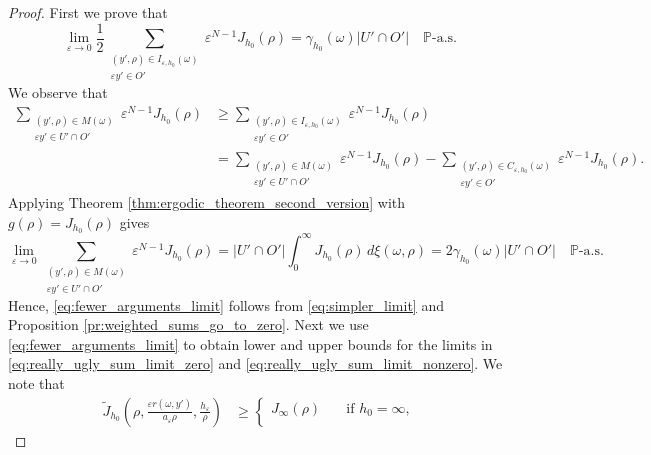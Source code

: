 \documentclass{article}
\numberwithin{equation}{section}
\theoremstyle{definition}
\theoremstyle{remark}
\begin{document}
\begin{proof}
    First we prove that
    \begin{equation} \label{eq:fewer_arguments_limit}
        \lim_{\varepsilon \to 0} \frac{1}{2} \sum \limits_{\substack{(y', \rho) \in I_{\varepsilon, h_0}(\omega) \\ \varepsilon y' \in O'}} \varepsilon^{N - 1} J_{h_0}(\rho) = \gamma_{h_0}(\omega) |U' \cap O'| \quad \mathbb{P}\text{-a.s.}
    \end{equation}
    We observe that
    \begin{align*}
        \sum \limits_{\substack{(y', \rho) \in M(\omega) \\ \varepsilon y' \in U' \cap O'}} \varepsilon^{N - 1} J_{h_0}(\rho) &\ge \sum \limits_{\substack{(y', \rho) \in I_{\varepsilon, h_0}(\omega) \\ \varepsilon y' \in O'}} \varepsilon^{N - 1} J_{h_0}(\rho) \\
        &= \sum \limits_{\substack{(y', \rho) \in M(\omega) \\ \varepsilon y' \in U' \cap O'}} \varepsilon^{N - 1} J_{h_0}(\rho) - \sum \limits_{\substack{(y', \rho) \in C_{\varepsilon, h_0}(\omega) \\ \varepsilon y' \in O'}} \varepsilon^{N - 1} J_{h_0}(\rho).
    \end{align*}
    Applying Theorem \ref{thm:ergodic_theorem_second_version} with $g(\rho) = J_{h_0}(\rho)$ gives
    \begin{equation} \label{eq:simpler_limit}
        \lim_{\varepsilon \to 0} \sum \limits_{\substack{(y', \rho) \in M(\omega) \\ \varepsilon y' \in U' \cap O'}} \varepsilon^{N - 1} J_{h_0}(\rho) = |U' \cap O'| \int_0^\infty J_{h_0}(\rho) \, d\xi(\omega, \rho) = 2 \gamma_{h_0}(\omega) |U' \cap O'| \quad \mathbb{P}\text{-a.s.}
    \end{equation}
    Hence, \eqref{eq:fewer_arguments_limit} follows from \eqref{eq:simpler_limit} and Proposition \ref{pr:weighted_sums_go_to_zero}. Next we use \eqref{eq:fewer_arguments_limit} to obtain lower and upper bounds for the limits in \eqref{eq:really_ugly_sum_limit_zero} and \eqref{eq:really_ugly_sum_limit_nonzero}. We note that
    \begin{equation*}
        \begin{aligned}
            \tilde{J}_{h_0}\left(\rho, \frac{\varepsilon r(\omega, y')}{a_\varepsilon \rho}, \frac{h_\varepsilon}{\rho}\right) &\ge 
            \begin{cases}
                J_\infty(\rho) \quad &\text{if } h_0 = \infty, \\

\end{cases}
\end{aligned}
\end{equation*}
\end{proof}
\end{document}
